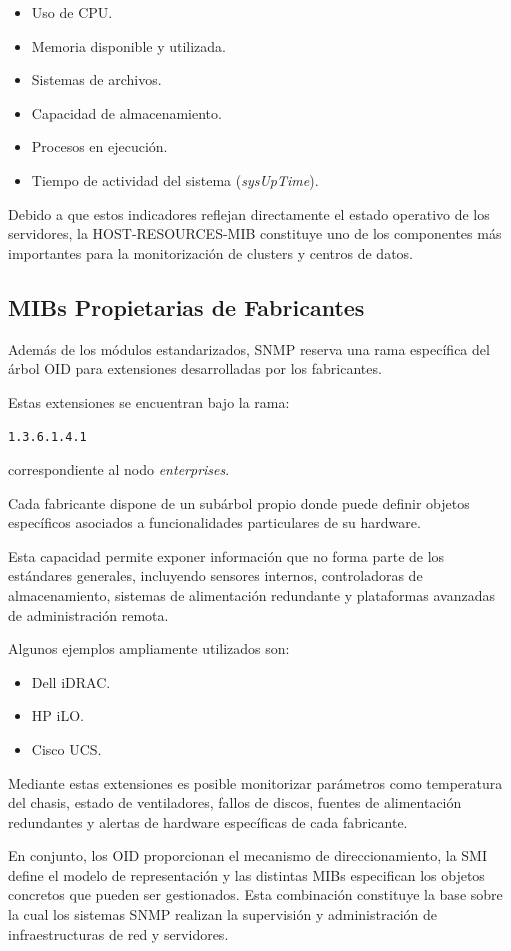 \begin{itemize}
\item Uso de CPU.
\item Memoria disponible y utilizada.
\item Sistemas de archivos.
\item Capacidad de almacenamiento.
\item Procesos en ejecución.
\item Tiempo de actividad del sistema (\textit{sysUpTime}).
\end{itemize}

Debido a que estos indicadores reflejan directamente el estado operativo de los servidores, la HOST-RESOURCES-MIB constituye uno de los componentes más importantes para la monitorización de clusters y centros de datos.

\subsection{MIBs Propietarias de Fabricantes}

Además de los módulos estandarizados, SNMP reserva una rama específica del árbol OID para extensiones desarrolladas por los fabricantes.

Estas extensiones se encuentran bajo la rama:

\begin{center}
\texttt{1.3.6.1.4.1}
\end{center}

correspondiente al nodo \textit{enterprises}.

Cada fabricante dispone de un subárbol propio donde puede definir objetos específicos asociados a funcionalidades particulares de su hardware.

Esta capacidad permite exponer información que no forma parte de los estándares generales, incluyendo sensores internos, controladoras de almacenamiento, sistemas de alimentación redundante y plataformas avanzadas de administración remota.

Algunos ejemplos ampliamente utilizados son:

\begin{itemize}
\item Dell iDRAC.
\item HP iLO.
\item Cisco UCS.
\end{itemize}

Mediante estas extensiones es posible monitorizar parámetros como temperatura del chasis, estado de ventiladores, fallos de discos, fuentes de alimentación redundantes y alertas de hardware específicas de cada fabricante.

En conjunto, los OID proporcionan el mecanismo de direccionamiento, la SMI define el modelo de representación y las distintas MIBs especifican los objetos concretos que pueden ser gestionados. Esta combinación constituye la base sobre la cual los sistemas SNMP realizan la supervisión y administración de infraestructuras de red y servidores.

